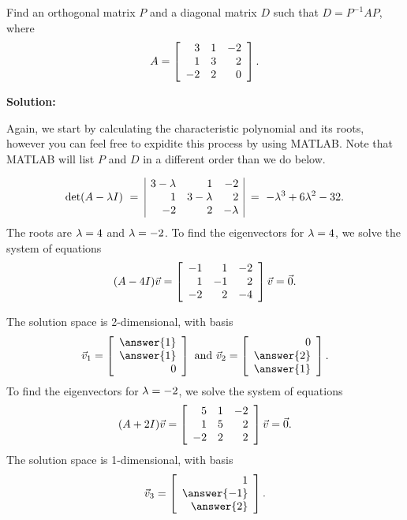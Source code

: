 \documentclass{ximera}
\begin{document}
\begin{example}\label{ex:diagonalization-symmetric2}

  Find an orthogonal matrix $P$ and a diagonal matrix $D$ such that $D =
  P^{-1}AP$, where
  \begin{equation*}
    A = \startmat{rrr}
      3  & 1 & -2 \\
      1  & 3 &  2 \\
      -2 & 2 &  0 \\
    \stopmat.
  \end{equation*}

  \textbf{Solution:}

  Again, we start by calculating the characteristic polynomial and its roots, however you can feel free to expidite this process by using MATLAB. Note that MATLAB will list $P$ and $D$ in a different order than we do below.

  \begin{equation*}
    \det(A-\eigenvar I)
    ~=~ \begin{array}{|rrr|}
      3-\eigenvar  & 1 & -2 \\
      1  & 3-\eigenvar &  2 \\
      -2 & 2 &  -\eigenvar  \\
    \end{array}
    ~=~ - \eigenvar^3 + 6\eigenvar^2 -32.
  \end{equation*}
  The roots are $\eigenvar=4$ and $\eigenvar=-2$. To find the
  eigenvectors for $\eigenvar=4$, we solve the system of equations
  \begin{equation*}
    (A-4I)\vect{v}
    =
    \startmat{rrr}
      -1  & 1 & -2 \\
      1  & -1 &  2 \\
      -2 & 2 &  -4 \\
    \stopmat\vect{v}
    = \vect{0}.
  \end{equation*}

  The solution space is 2-dimensional, with basis
  \begin{equation*}
    \vect{v}_1 = \startmat{r} \answer{1} \\ \answer{1} \\ 0 \stopmat
    \quad\mbox{and}\quad
    \vect{v}_2 = \startmat{r} 0 \\ \answer{2} \\ \answer{1} \stopmat.
  \end{equation*}
  To find the eigenvectors for $\eigenvar=-2$, we solve the system of
  equations
  \begin{equation*}
    (A+2I)\vect{v}
    =
    \startmat{rrr}
      5  & 1 & -2 \\
      1  & 5 &  2 \\
      -2 & 2 &  2 \\
    \stopmat\vect{v}
    = \vect{0}.
  \end{equation*}
  The solution space is 1-dimensional, with basis
  \begin{equation*}
    \vect{v}_3 = \startmat{r} 1 \\ \answer{-1} \\ \answer{2} \stopmat.
  \end{equation*}


\end{example}
\end{document}
